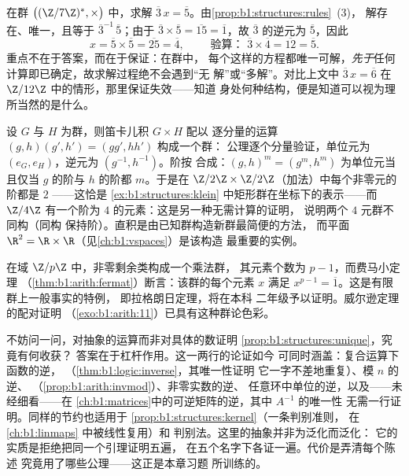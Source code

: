 \begin{example}[群公理作为求解的保证]\label{ex:b1:structures:solving}
在群 $\bigl((\Z/7\Z)^*, \times\bigr)$ 中，求解 $\overline
3\,x = \overline 5$。由\cref{prop:b1:structures:rules}~(3)，
解存在、唯一，且等于 $\overline3^{-1}\,
\overline5$；由于 $\overline3 \times \overline5 = \overline{15}
= \overline1$，故 $\overline 3$ 的逆元为 $\overline 5$，因此
\[
x = \overline5 \times \overline5 = \overline{25} = \overline4,
\qquad\text{ 验算： } \overline3 \times \overline4 =
\overline{12} = \overline5 .
\]
重点不在于答案，而在于保证：在群中，
每个这样的方程都唯一可解，\emph{先于}任何
计算即已确定，故求解过程绝不会遇到“无
解”或“多解”。对比上文中 $\overline3\,x = \overline6$
在 $\Z/12\Z$ 中的情形，那里保证失效——知道
身处何种结构，便是知道可以视为理所当然的是什么。
\end{example}

\begin{example}[直积]\label{ex:b1:structures:product}
设 $G$ 与 $H$ 为群，则笛卡儿积 $G \times H$ 配以
逐分量的运算 $(g, h)(g', h') = (gg', hh')$ 构成一个群：
公理逐个分量验证，单位元为
$(e_G, e_H)$，逆元为 $(g^{-1}, h^{-1})$。阶按
合成：$(g, h)^m = (g^m, h^m)$ 为单位元当且仅当
$g$ 的阶与 $h$ 的阶都 $m$。于是在 $\Z/2\Z
\times \Z/2\Z$（加法）中每个非零元的阶都是 $2$
——这恰是
\cref{ex:b1:structures:klein} 中矩形群在坐标下的表示——而 $\Z/4\Z$
有一个阶为 $4$ 的元素：这是另一种无需计算的证明，
说明两个 $4$ 元群不同构（同构
保持阶）。直积是由已知群构造新群最简便的方法，
而平面 $\R^2 = \R \times
\R$（见\cref{ch:b1:vspaces}）是该构造
最重要的实例。
\end{example}

\begin{remark}[从结构看费马定理]
在域 $\Z/p\Z$ 中，非零剩余类构成一个乘法群，
其元素个数为 $p - 1$，而费马小定理
（\cref{thm:b1:arith:fermat}）断言：该群的每个元素 $x$
满足 $x^{p-1} = \overline 1$。这是有限群上一般事实的特例，
即拉格朗日定理，将在本科
二年级予以证明。威尔逊定理的配对证明
（\cref{exo:b1:arith:11}）已具有这种群论色彩。
\end{remark}

\begin{remark}[插曲：抽象带来了什么]\label{rem:b1:structures:interlude}
不妨问一问，对抽象的运算而非对具体的数证明
\cref{prop:b1:structures:unique}，究竟有何收获？
答案在于杠杆作用。这一两行的论证如今
可同时涵盖：复合运算下函数的逆，
（\cref{thm:b1:logic:inverse}，其唯一性证明
它一字不差地重复）、模 $n$ 的逆、
（\cref{prop:b1:arith:invmod}）、非零实数的逆、
任意环中单位的逆，以及——未经细看——在
\cref{ch:b1:matrices}中的可逆矩阵的逆，其中 $A^{-1}$ 的唯一性
无需一行证明。同样的节约也适用于
\cref{prop:b1:structures:kernel}（一条判别准则，
在 \cref{ch:b1:linmaps} 中被线性复用）和
判别法。这里的抽象并非为泛化而泛化：
它的实质是拒绝把同一个引理证明五遍，
在五个名字下各证一遍。代价是弄清每个陈述
究竟用了哪些公理——这正是本章习题
所训练的。
\end{remark}

